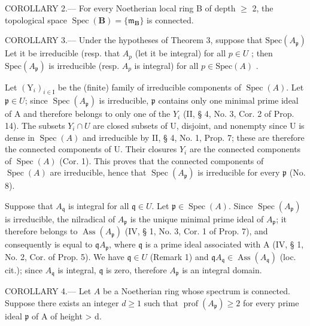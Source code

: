 COROLLARY 2.--- For every Noetherian local ring B of depth \(\geqslant\) 2, the topological space \(\operatorname{Spec}(\mathbf{B}) = \{\mathfrak{m}_{\mathbf{B}}\}\) is connected.

COROLLARY 3.--- Under the hypotheses of Theorem 3, suppose that \(\text{Spec}(A_{\mathfrak{p}})\) Let it be irreducible (resp. that \(A_{p}\) (let it be integral) for all \(p \in U\) ; then \(\text{Spec}(A_{\mathfrak{p}})\) is irreducible (resp. \(A_{p}\) is integral) for all \(p \in \text{Spec}(A)\) .

Let \((\mathrm{Y}_{i})_{i\in\mathrm{I}}\) be the (finite) family of irreducible components of \(\operatorname{Spec}(A)\). Let \(\mathfrak{p}\in U\); since \(\operatorname{Spec}(A_{\mathfrak{p}})\) is irreducible, \(\mathfrak{p}\) contains only one minimal prime ideal of A and therefore belongs to only one of the \(Y_i\) (II, § 4, No. 3, Cor. 2 of Prop. 14). The subsets \(Y_i\cap U\) are closed subsets of U, disjoint, and nonempty since U is dense in \(\operatorname{Spec}(A)\) and irreducible by II, § 4, No. 1, Prop. 7; these are therefore the connected components of U. Their closures \(Y_i\) are the connected components of \(\operatorname{Spec}(A)\) (Cor. 1). This proves that the connected components of \(\operatorname{Spec}(A)\) are irreducible, hence that \(\operatorname{Spec}(A_{\mathfrak{p}})\) is irreducible for every \(\mathfrak{p}\) (No. 8).

Suppose that \(A_{\mathfrak{q}}\) is integral for all \(\mathfrak{q} \in U\). Let \(\mathfrak{p} \in \operatorname{Spec}(A)\). Since \(\operatorname{Spec}(A_{\mathfrak{p}})\) is irreducible, the nilradical of \(A_{\mathfrak{p}}\) is the unique minimal prime ideal of \(A_{\mathfrak{p}}\); it therefore belongs to \(\operatorname{Ass}(A_{\mathfrak{p}})\) (IV, § 1, No. 3, Cor. 1 of Prop. 7), and consequently is equal to \(\mathfrak{q}A_{\mathfrak{p}}\), where \(\mathfrak{q}\) is a prime ideal associated with A (IV, § 1, No. 2, Cor. of Prop. 5). We have \(\mathfrak{q} \in U\) (Remark 1) and \(\mathfrak{q}A_{\mathfrak{q}} \in \operatorname{Ass}(A_{\mathfrak{q}})\) (loc. cit.); since \(A_{\mathfrak{q}}\) is integral, \(\mathfrak{q}\) is zero, therefore \(A_{\mathfrak{p}}\) is an integral domain.

COROLLARY 4.--- Let \(A\) be a Noetherian ring whose spectrum is connected. Suppose there exists an integer \(d \geqslant 1\) such that \(\operatorname{prof}(A_{\mathfrak{p}}) \geqslant 2\) for every prime ideal \(\mathfrak{p}\) of A of height \textgreater{} d.

